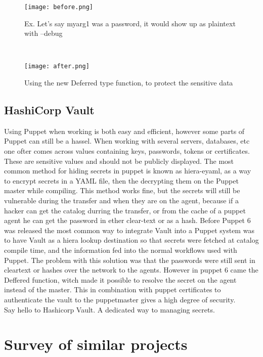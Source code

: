 \begin{figure}[h!]
  \texttt{[image: before.png]}  \caption{Ex. Let's say myarg1 was a password, it would show up as plaintext with --debug}
\end{figure}

\\

\begin{figure}[h!]
  \texttt{[image: after.png]}  \caption{Using the new Deferred type function, to protect the sensitive data}
\end{figure}


\subsection{HashiCorp Vault}
Using Puppet when working is both easy and efficient, however some parts of Puppet can still be a hassel. When working with several servers, databases, etc one ofter comes across values containing keys, passwords, tokens or certificates. These are sensitive values and should not be publicly displayed. The most common method for hiding secrets in puppet is known as hiera-eyaml, as a way to encrypt secrets in a YAML file, then the decrypting them on the Puppet master while compiling. This method works fine, but the secrets will still be vulnerable during the transfer and when they are on the agent, because if a hacker can get the catalog durring the transfer, or from the cache of a puppet agent he can get the password in ether clear-text or as a hash. Before Puppet 6 was released the most common way to integrate Vault into a Puppet system was to have Vault as a hiera lookup destination so that secrets were fetched at catalog compile time, and the information fed into the normal workflows used with Puppet. The problem with this solution was that the passwords were still sent in cleartext or hashes over the network to the agents. However in puppet 6 came the Deffered function, witch made it possible to resolve the secret on the agent instead of the master. This in combination with puppet certificates to authenticate the vault to the puppetmaster gives a high degree of security.
\\
Say hello to Hashicorp Vault. A dedicated way to managing secrets.

\section{Survey of similar projects}

